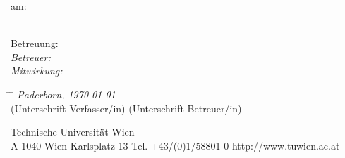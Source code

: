 \begin{titlepage}
\begin{flushleft}
am: \\ \textit{\institut} \\
\end{flushleft}


\begin{flushleft}
\smallskip
Betreuung: \\
\textit{Betreuer: \betreuer} \\
\textit{Mitwirkung: \assistent}
\end{flushleft}

\date{\today}
\numdate

\footnotesize
\vspace{1.5cm}

\begin{flushleft}
\begin{tabbing}%
\hspace{4.5cm} \= \hspace{5cm} \= \hspace{5cm} \kill
\textit{Paderborn, \today} \> \underline{\hspace*{5cm}} \> \hspace{0.8cm} \underline{\hspace*{5cm}} \\
     \> \hspace{0.1cm} (Unterschrift Verfasser/in) \> \hspace{1.0cm} (Unterschrift Betreuer/in) \\
\end{tabbing}
\end{flushleft}

\vspace{0.9cm}

\begin{minipage}[b]{1.0\linewidth}
\begin{center}
\underline{\hspace*{15.5cm}}
\scriptsize{
Technische Universit\"{a}t Wien \\
A-1040 Wien \hspace{0.5cm} Karlsplatz 13 \hspace{0.5cm} Tel. +43/(0)1/58801-0 \hspace{0.5cm} http://www.tuwien.ac.at
}
\end{center}
\end{minipage}

\vspace*{-2.5cm}

\end{titlepage}

%
%

